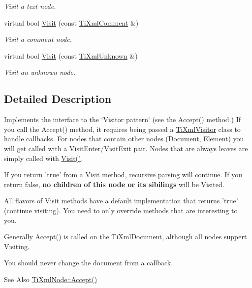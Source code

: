 \begin{DoxyCompactItemize}
\begin{DoxyCompactList}\small\item\em Visit a text node. \end{DoxyCompactList}\item 
virtual bool \hyperlink{class_ti_xml_visitor_a53a60e7a528627b31af3161972cc7fa2}{Visit} (const \hyperlink{class_ti_xml_comment}{Ti\-Xml\-Comment} \&)
\begin{DoxyCompactList}\small\item\em Visit a comment node. \end{DoxyCompactList}\item 
virtual bool \hyperlink{class_ti_xml_visitor_a7e284d607d275c51dac1adb58159ce28}{Visit} (const \hyperlink{class_ti_xml_unknown}{Ti\-Xml\-Unknown} \&)
\begin{DoxyCompactList}\small\item\em Visit an unknown node. \end{DoxyCompactList}\end{DoxyCompactItemize}


\subsection{Detailed Description}
Implements the interface to the \char`\"{}\-Visitor pattern\char`\"{} (see the Accept() method.) If you call the Accept() method, it requires being passed a \hyperlink{class_ti_xml_visitor}{Ti\-Xml\-Visitor} class to handle callbacks. For nodes that contain other nodes (Document, Element) you will get called with a Visit\-Enter/\-Visit\-Exit pair. Nodes that are always leaves are simply called with \hyperlink{class_ti_xml_visitor_afad71c71ce6473fb9b4b64cd92de4a19}{Visit()}.

If you return 'true' from a Visit method, recursive parsing will continue. If you return false, {\bfseries no children of this node or its sibilings} will be Visited.

All flavors of Visit methods have a default implementation that returns 'true' (continue visiting). You need to only override methods that are interesting to you.

Generally Accept() is called on the \hyperlink{class_ti_xml_document}{Ti\-Xml\-Document}, although all nodes suppert Visiting.

You should never change the document from a callback.

\begin{DoxySeeAlso}{See Also}
\hyperlink{class_ti_xml_node_acc0f88b7462c6cb73809d410a4f5bb86}{Ti\-Xml\-Node\-::\-Accept()} 
\end{DoxySeeAlso}


